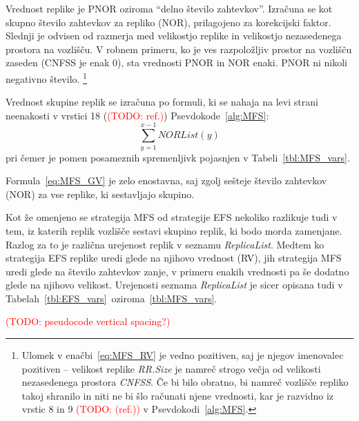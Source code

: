 \documentclass[a4paper, 12pt]{book}
\newcommand{\TODO}[1]{\textcolor{red}{(TODO: #1)}}
\begin{document}
Vrednost replike je PNOR oziroma ``delno število zahtevkov''. Izračuna
se kot skupno število zahtevkov za repliko (NOR), prilagojeno za
korekcijski faktor. Slednji je odvisen od razmerja med velikostjo replike
in velikostjo nezasedenega prostora na vozlišču. V robnem primeru,
ko je ves razpoložljiv prostor na vozlišču zaseden (CNFSS je enak 0), sta
vrednosti PNOR in NOR enaki. PNOR ni nikoli negativno število.%
\footnote{Ulomek v enačbi~\eqref{eq:MFS_RV} je vedno pozitiven, saj
je njegov imenovalec pozitiven -- velikost replike \textit{RR.Size} je
namreč strogo večja od velikosti nezasedenega prostora \textit{CNFSS}. Če
bi bilo obratno, bi namreč vozlišče repliko takoj shranilo in niti ne bi
šlo računati njene vrednosti, kar je razvidno iz vrstic 8 in 9
 \TODO{(ref.)} v Psevdokodi~\ref{alg:MFS}.}



\begin{samepage}
Vrednost skupine replik se izračuna po formuli, ki se nahaja na levi strani
neenakosti v vrstici 18 (\TODO{ref.}) Psevdokode~\ref{alg:MFS}:
\begin{equation}
	\sum\limits_{y=1}^{x-1} \mathit{NORList(y)}
  \label{eq:MFS_GV}
\end{equation}
pri čemer je pomen posameznih spremenljivk pojasnjen v
Tabeli~\ref{tbl:MFS_vars}.
\end{samepage}

Formula~\eqref{eq:MFS_GV} je zelo enostavna, saj zgolj sešteje število
zahtevkov (NOR) za vse replike, ki sestavljajo skupino.

Kot že omenjeno se strategija MFS od strategije EFS nekoliko razlikuje
tudi v tem, iz katerih replik vozlišče sestavi skupino replik, ki bodo morda
zamenjane. Razlog za to je različna urejenost replik v seznamu
\textit{ReplicaList}. Medtem ko strategija EFS replike uredi glede na
njihovo vrednost (RV), jih strategija MFS uredi glede na
število zahtevkov zanje, v primeru enakih vrednosti pa še dodatno
glede na njihovo velikost. Urejenosti seznama \textit{ReplicaList} je
sicer opisana tudi v Tabelah~\ref{tbl:EFS_vars}~oziroma~\ref{tbl:MFS_vars}.

\TODO{pseudocode vertical spacing?}
\end{document}
